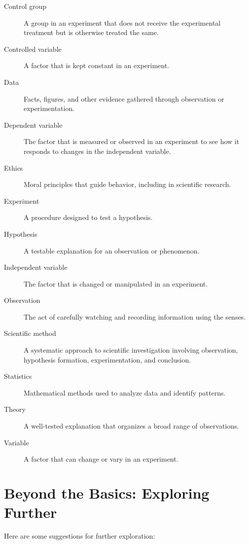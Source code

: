 \documentclass[justified,notoc]{tufte-book}
\begin{document}
\begin{description}
    \item[Control group] A group in an experiment that does not receive the experimental treatment but is otherwise treated the same.
    \item[Controlled variable] A factor that is kept constant in an experiment.
    \item[Data] Facts, figures, and other evidence gathered through observation or experimentation.
    \item[Dependent variable] The factor that is measured or observed in an experiment to see how it responds to changes in the independent variable.
    \item[Ethics] Moral principles that guide behavior, including in scientific research.
    \item[Experiment] A procedure designed to test a hypothesis.
    \item[Hypothesis] A testable explanation for an observation or phenomenon.
    \item[Independent variable] The factor that is changed or manipulated in an experiment.
    \item[Observation] The act of carefully watching and recording information using the senses.
    \item[Scientific method] A systematic approach to scientific investigation involving observation, hypothesis formation, experimentation, and conclusion.
    \item[Statistics] Mathematical methods used to analyze data and identify patterns.
    \item[Theory] A well-tested explanation that organizes a broad range of observations.
    \item[Variable] A factor that can change or vary in an experiment.
\end{description}

\section{Beyond the Basics: Exploring Further}

 Here are some suggestions for further exploration:
\end{document}
